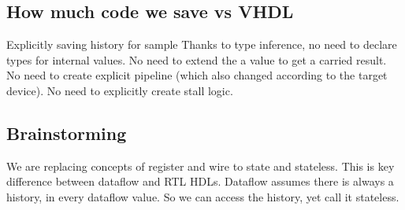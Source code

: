 \subsection{How much code we save vs VHDL}
Explicitly saving history for sample
Thanks to type inference, no need to declare types for internal values.
No need to extend the a value to get a carried result.
No need to create explicit pipeline (which also changed according to the target device).
No need to explicitly create stall logic.

\subsection{Brainstorming}
We are replacing concepts of register and wire to state and stateless. This is key difference between dataflow and RTL HDLs. Dataflow assumes there is always a history, in every dataflow value. So we can access the history, yet call it stateless.





%
%
%
%
%

